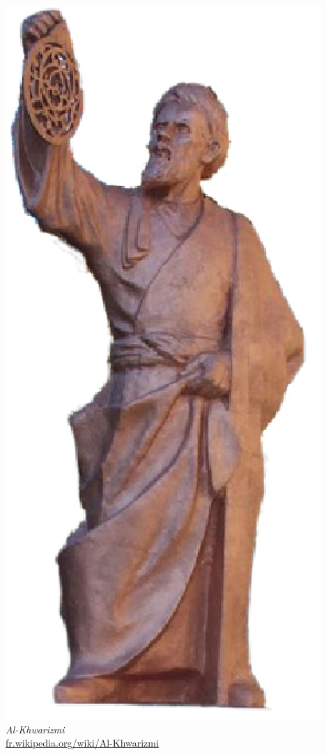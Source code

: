 \documentclass[letterpaper, 12pt]{article}
\begin{document}
\begin{center}
\includegraphics[scale=0.25]{Al-Khwarizmi.eps}\\
\emph{{\small Al-Khwarizmi}}\\
\href{http://fr.wikipedia.org/wiki/Al-Khwarizmi}{fr.wikipedia.org/wiki/Al-Khwarizmi}\\[5mm]
\end{center}
\end{document}
